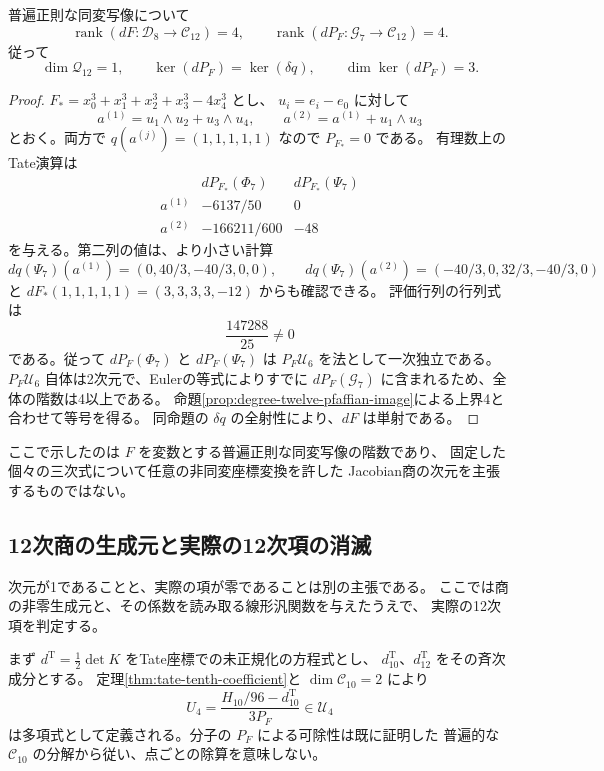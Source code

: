 \begin{proposition}[12次contact商は1次元]
\label{prop:v10-contact-exact-rank}
普遍正則な同変写像について
\[
 \operatorname{rank}(dF\colon\mathcal D_8\to\mathcal C_{12})=4,
 \qquad
 \operatorname{rank}(dP_F\colon\mathcal G_7\to\mathcal C_{12})=4.
\]
従って
\[
 \dim\mathcal Q_{12}=1,\qquad
 \ker(dP_F)=\ker(\delta q),\qquad\dim\ker(dP_F)=3.
\]
\end{proposition}
\begin{proof}
$F_*=x_0^3+x_1^3+x_2^3+x_3^3-4x_4^3$ とし、
$u_i=e_i-e_0$ に対して
\[
 a^{(1)}=u_1\wedge u_2+u_3\wedge u_4,
 \qquad a^{(2)}=a^{(1)}+u_1\wedge u_3
\]
とおく。両方で $q(a^{(j)})=(1,1,1,1,1)$ なので $P_{F_*}=0$ である。
有理数上のTate演算は
\[
\begin{array}{c|cc}
 &dP_{F_*}(\Phi_7)&dP_{F_*}(\Psi_7)\\\hline
 a^{(1)}&-6137/50&0\\
 a^{(2)}&-166211/600&-48
\end{array}
\]
を与える。第二列の値は、より小さい計算
\[
 dq(\Psi_7)(a^{(1)})=(0,40/3,-40/3,0,0),
 \qquad
 dq(\Psi_7)(a^{(2)})=(-40/3,0,32/3,-40/3,0)
\]
と $dF_*(1,1,1,1,1)=(3,3,3,3,-12)$ からも確認できる。
評価行列の行列式は
\[
 \frac{147288}{25}\ne0
\]
である。従って $dP_F(\Phi_7)$ と $dP_F(\Psi_7)$ は
$P_F\mathcal U_6$ を法として一次独立である。
$P_F\mathcal U_6$ 自体は2次元で、Eulerの等式によりすでに
$dP_F(\mathcal G_7)$ に含まれるため、全体の階数は4以上である。
命題\ref{prop:degree-twelve-pfaffian-image}による上界4と合わせて等号を得る。
同命題の $\delta q$ の全射性により、$dF$ は単射である。
\end{proof}

ここで示したのは $F$ を変数とする普遍正則な同変写像の階数であり、
固定した個々の三次式について任意の非同変座標変換を許した
Jacobian商の次元を主張するものではない。


\subsection{12次商の生成元と実際の12次項の消滅}
\label{subsec:v10-actual-twelfth-class}

次元が1であることと、実際の項が零であることは別の主張である。
ここでは商の非零生成元と、その係数を読み取る線形汎関数を与えたうえで、
実際の12次項を判定する。

まず $d^{\mathrm T}=\tfrac12\det K$ をTate座標での未正規化の方程式とし、
$d^{\mathrm T}_{10}$、$d^{\mathrm T}_{12}$ をその斉次成分とする。
定理\ref{thm:tate-tenth-coefficient}と $\dim\mathcal C_{10}=2$ により
\begin{equation}\label{eq:v10-normalized-U4}
 U_4=\frac{H_{10}/96-d^{\mathrm T}_{10}}{3P_F}
       \in\mathcal U_4
\end{equation}
は多項式として定義される。分子の $P_F$ による可除性は既に証明した
普遍的な $\mathcal C_{10}$ の分解から従い、点ごとの除算を意味しない。

